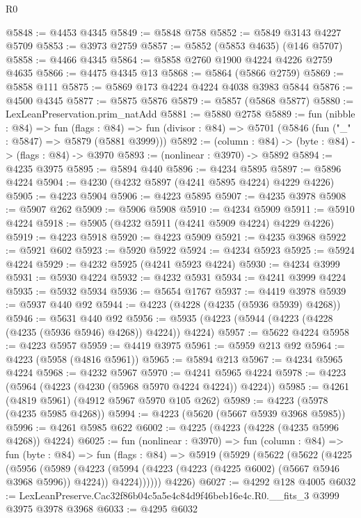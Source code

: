 \begin{lexlean}{R0}
\begin{coremodule}
@5848 := @4453 @4345
@5849 := @5848 @758
@5852 := @5849 @3143 @4227 @5709
@5853 := @3973 @2759
@5857 := @5852 (@5853 @4635) (@146 @5707)
@5858 := @4466 @4345
@5864 := @5858 @2760 @1900 @4224 @4226 @2759 @4635
@5866 := @4475 @4345 @13
@5868 := @5864 (@5866 @2759)
@5869 := @5858 @111
@5875 := @5869 @173 @4224 @4224 @4038 @3983 @5844
@5876 := @4500 @4345
@5877 := @5875 @5876
@5879 := @5857 (@5868 @5877)
@5880 := LexLeanPreservation.prim_natAdd
@5881 := @5880 @2758
@5889 := fun (nibble : @84) =>
  fun (flags : @84) =>
  fun (divisor : @84) => @5701 (@5846 (fun ("_" : @5847) => @5879 (@5881 @3999)))
@5892 := (column : @84) -> (byte : @84) -> (flags : @84) -> @3970
@5893 := (nonlinear : @3970) -> @5892
@5894 := @4235 @3975
@5895 := @5894 @440
@5896 := @4234 @5895
@5897 := @5896 @4224
@5904 := @4230 (@4232 @5897 (@4241 @5895 @4224) @4229 @4226)
@5905 := @4223 @5904
@5906 := @4223 @5895
@5907 := @4235 @3978
@5908 := @5907 @262
@5909 := @5906 @5908
@5910 := @4234 @5909
@5911 := @5910 @4224
@5918 := @5905 (@4232 @5911 (@4241 @5909 @4224) @4229 @4226)
@5919 := @4223 @5918
@5920 := @4223 @5909
@5921 := @4235 @3968
@5922 := @5921 @602
@5923 := @5920 @5922
@5924 := @4234 @5923
@5925 := @5924 @4224
@5929 := @4232 @5925 (@4241 @5923 @4224)
@5930 := @4234 @3999
@5931 := @5930 @4224
@5932 := @4232 @5931
@5934 := @4241 @3999 @4224
@5935 := @5932 @5934
@5936 := @5654 @1767
@5937 := @4419 @3978
@5939 := @5937 @440 @92
@5944 := @4223 (@4228 (@4235 (@5936 @5939) @4268))
@5946 := @5631 @440 @92
@5956 := @5935 (@4223 (@5944 (@4223 (@4228 (@4235 (@5936 @5946) @4268)) @4224)) @4224)
@5957 := @5622 @4224
@5958 := @4223 @5957
@5959 := @4419 @3975
@5961 := @5959 @213 @92
@5964 := @4223 (@5958 (@4816 @5961))
@5965 := @5894 @213
@5967 := @4234 @5965 @4224
@5968 := @4232 @5967
@5970 := @4241 @5965 @4224
@5978 := @4223 (@5964 (@4223 (@4230 (@5968 @5970 @4224 @4224)) @4224))
@5985 := @4261 (@4819 @5961) (@4912 @5967 @5970 @105 @262)
@5989 := @4223 (@5978 (@4235 @5985 @4268))
@5994 := @4223 (@5620 (@5667 @5939 @3968 @5985))
@5996 := @4261 @5985 @622
@6002 := @4225 (@4223 (@4228 (@4235 @5996 @4268)) @4224)
@6025 := fun (nonlinear : @3970) =>
  fun (column : @84) =>
  fun (byte : @84) =>
  fun (flags : @84) =>
  @5919
    (@5929
      (@5622
        (@5622
          (@4225
            (@5956
              (@5989
                (@4223
                  (@5994 (@4223 (@4223 (@4225 @6002) (@5667 @5946 @3968 @5996)) @4224))
                  @4224))))))
      @4226)
@6027 := @4292 @128 @4005
@6032 := LexLeanPreserve.Cac32f86b04c5a5e4c84d9f46beb16e4c.R0.__fits_3 @3999 @3975 @3978 @3968
@6033 := @4295 @6032

\end{coremodule}
\end{lexlean}
